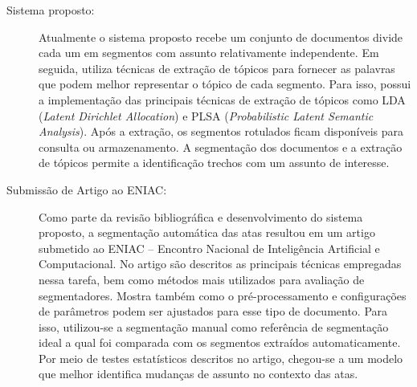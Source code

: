 \begin{description}
	
	\item[Sistema proposto:] Atualmente o sistema proposto recebe um conjunto de documentos divide cada um em segmentos com assunto relativamente independente. Em seguida, utiliza técnicas de extração de tópicos para fornecer as palavras que podem melhor representar o tópico de cada segmento. Para isso, possui a implementação das principais técnicas de extração de tópicos como LDA (\textit{Latent Dirichlet Allocation}) e PLSA (\textit{Probabilistic Latent Semantic Analysis}). Após a extração, os segmentos rotulados ficam disponíveis para consulta ou armazenamento. A segmentação dos documentos e a extração de tópicos permite a identificação trechos com um assunto de interesse.
	
	
	
	\item[Submissão de Artigo ao ENIAC:] Como parte da revisão bibliográfica e desenvolvimento do sistema proposto, a segmentação automática das atas resultou em um artigo submetido ao ENIAC -- Encontro Nacional de Inteligência Artificial e Computacional. 
%	
No artigo são descritos as principais técnicas empregadas nessa tarefa, bem como métodos mais utilizados para avaliação de segmentadores. Mostra também como o pré-processamento e configurações de parâmetros podem ser ajustados para esse tipo de documento. Para isso, utilizou-se a segmentação manual como referência de segmentação ideal a qual foi comparada com os segmentos extraídos automaticamente. Por meio de testes estatísticos descritos no artigo, chegou-se a um modelo que melhor identifica mudanças de assunto no contexto das atas.
	
	
\end{description}
























